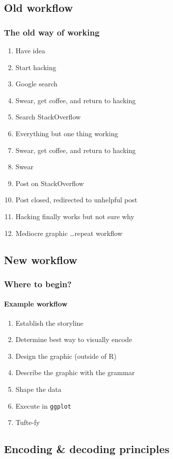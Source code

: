 \documentclass{beamer}
\begin{document}
\subsection{Old workflow}
\begin{frame}\frametitle{The old way of working}
\begin{enumerate}
	\footnotesize
	\item Have idea 
	\item Start hacking 
	\item Google search \
	\item Swear, get coffee, and return to hacking 
	\item Search StackOverflow
	\item Everything but one thing working 
	\item Swear, get coffee, and return to hacking
	\item Swear
	\item Post on StackOverflow 
	\item Post closed, redirected to unhelpful post
	\item Hacking finally works but not sure why 
	\item Mediocre graphic \ldots \alert{repeat workflow}
\end{enumerate}
\end{frame}

\subsection{New workflow}
\begin{frame}\frametitle{Where to begin?}
\framesubtitle{Example workflow}


\begin{enumerate}
	\item Establish the storyline 
	\item Determine best way to visually encode 
	\item Design the graphic (outside of R) 
	\item Describe the graphic with the grammar 
	\item Shape the data 
	\item Execute in \texttt{ggplot} 
	\item Tufte-fy 
\end{enumerate}
\end{frame}

\subsection{Encoding \& decoding principles}
\end{document}
